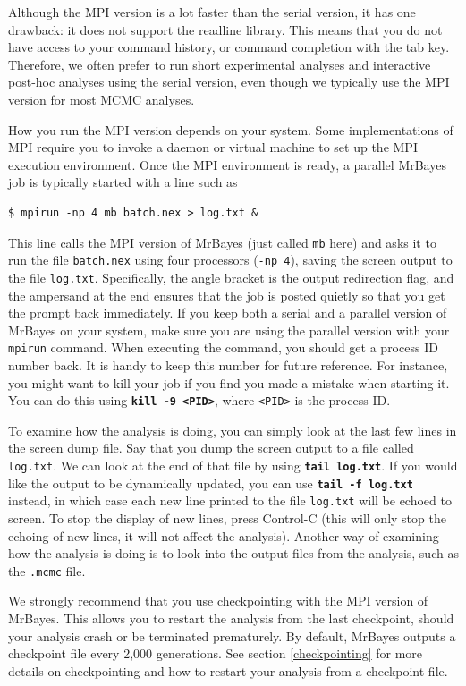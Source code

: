 \documentclass[12pt]{book}
\newcommand{\ttt}[1]{\texttt{#1}}
\newcommand{\tb}[1]{\ttt{\textbf{#1}}}
\begin{document}
Although the MPI version is a lot faster than the serial version, it has one drawback: it does not
support the readline library. This means that you do not have access to your command history, or
command completion with the tab key. Therefore, we often prefer to run short experimental analyses
and interactive post-hoc analyses using the serial version, even though we typically use the MPI
version for most MCMC analyses.

How you run the MPI version depends on your system. Some implementations of MPI require you to
invoke a daemon or virtual machine to set up the MPI execution environment. Once the MPI
environment is ready, a parallel MrBayes job is typically started with a line such as

\begin{Verbatim}
$ mpirun -np 4 mb batch.nex > log.txt &
\end{Verbatim}

This line calls the MPI version of MrBayes (just called \texttt{mb} here) and asks it to run the
file \texttt{batch.nex} using four processors (\texttt{-np 4}), saving the screen output to the
file \texttt{log.txt}. Specifically, the angle bracket is the output redirection flag, and the
ampersand at the end ensures that the job is posted quietly so that you get the prompt back
immediately. If you keep both a serial and a parallel version of MrBayes on your system, make sure
you are using the parallel version with your \texttt{mpirun} command. When executing the command,
you should get a process ID number back. It is handy to keep this number for future reference. For
instance, you might want to kill your job if you find you made a mistake when starting it. You can
do this using \tb{kill -9 <PID>}, where \texttt{<PID>} is the process ID.

To examine how the analysis is doing, you can simply look at the last few lines in the screen dump
file. Say that you dump the screen output to a file called \texttt{log.txt}. We can look at the end
of that file by using \tb{tail log.txt}. If you would like the output to be dynamically updated,
you can use \tb{tail -f log.txt} instead, in which case each new line printed to the file
\texttt{log.txt} will be echoed to screen. To stop the display of new lines, press Control-C (this
will only stop the echoing of new lines, it will not affect the analysis). Another way of examining
how the analysis is doing is to look into the output files from the analysis, such as the
\texttt{.mcmc} file.

We strongly recommend that you use checkpointing with the MPI version of MrBayes. This allows you
to restart the analysis from the last checkpoint, should your analysis crash or be terminated
prematurely. By default, MrBayes outputs a checkpoint file every 2,000 generations. See section
\ref{checkpointing} for more details on checkpointing and how to restart your analysis from a
checkpoint file.
\end{document}
